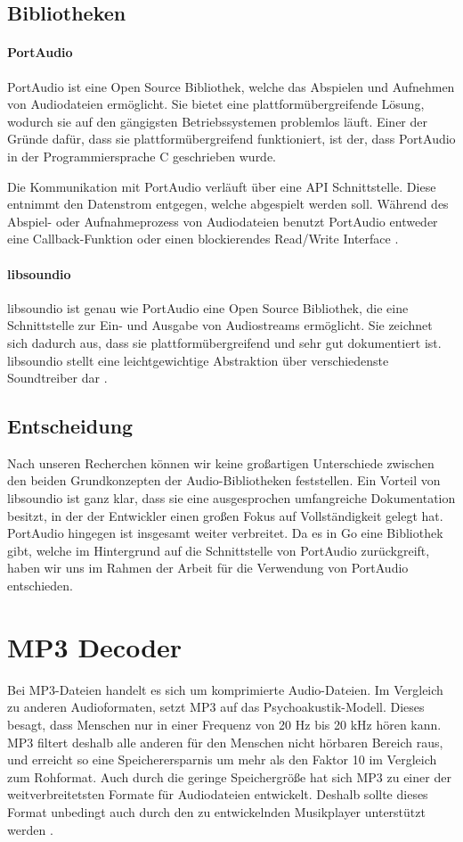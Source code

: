 \subsection{Bibliotheken}
\paragraph{PortAudio}
PortAudio ist eine Open Source Bibliothek, welche das Abspielen und Aufnehmen
von Audiodateien ermöglicht. Sie bietet eine plattformübergreifende Lösung,
wodurch sie auf den gängigsten Betriebssystemen problemlos läuft. Einer der
Gründe dafür, dass sie plattformübergreifend funktioniert, ist der, dass
PortAudio in der Programmiersprache C geschrieben wurde. \hfill \break

Die Kommunikation mit PortAudio verläuft über eine \ac{API} Schnittstelle.
Diese entnimmt den Datenstrom entgegen, welche abgespielt werden soll. Während
des Abspiel- oder Aufnahmeprozess von Audiodateien benutzt PortAudio entweder
eine Callback-Funktion oder einen blockierendes Read/Write Interface
\autocite{PortAudio_2019}.

\paragraph{libsoundio}
libsoundio ist genau wie PortAudio eine Open Source Bibliothek, die eine
Schnittstelle zur Ein- und Ausgabe von Audiostreams ermöglicht. Sie zeichnet
sich dadurch aus, dass sie plattformübergreifend und sehr gut dokumentiert ist.
libsoundio stellt eine leichtgewichtige Abstraktion über verschiedenste
Soundtreiber dar \autocite{libsoundio_2019}.

\subsection{Entscheidung}
Nach unseren Recherchen können wir keine großartigen Unterschiede zwischen den
beiden Grundkonzepten der Audio-Bibliotheken feststellen. Ein Vorteil von
libsoundio ist ganz klar, dass sie eine ausgesprochen umfangreiche
Dokumentation besitzt, in der der Entwickler einen großen Fokus auf
Vollständigkeit gelegt hat. PortAudio hingegen ist insgesamt weiter verbreitet.
Da es in Go eine Bibliothek gibt, welche im Hintergrund auf die Schnittstelle
von PortAudio zurückgreift, haben wir uns im Rahmen der Arbeit für die
Verwendung von PortAudio entschieden.

\section{MP3 Decoder}
Bei MP3-Dateien handelt es sich um komprimierte Audio-Dateien. Im Vergleich zu
anderen Audioformaten, setzt MP3 auf das Psychoakustik-Modell. Dieses besagt,
dass Menschen nur in einer Frequenz von 20 Hz bis 20 kHz hören kann. MP3
filtert deshalb alle anderen für den Menschen nicht hörbaren Bereich raus, und
erreicht so eine Speicherersparnis um mehr als den Faktor 10 im Vergleich zum
Rohformat. Auch durch die geringe Speichergröße hat sich MP3 zu einer der weitverbreitetsten Formate für Audiodateien entwickelt. 
Deshalb sollte dieses Format unbedingt auch durch den zu entwickelnden Musikplayer unterstützt werden
\autocite{mp3}. \hfill \break

